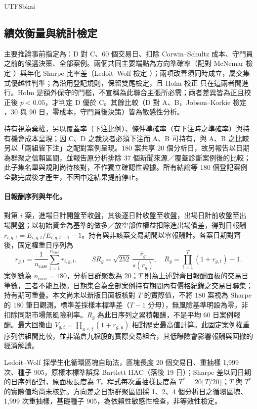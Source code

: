 \documentclass[12pt,a4paper]{article}
\newcommand{\grp}[1]{\textsf{#1}}
\begin{document}
\begin{CJK}{UTF8}{bkai}
\subsection{績效衡量與統計檢定}

主要推論事前指定為：\grp{D} 對 \grp{C}、60 個交易日、扣除 Corwin--Schultz 成本、守門員之前的候選決策、全部案例。兩個共同主要端點為方向準確率（配對 McNemar 檢定 \citep{mcnemar1947}）與年化 Sharpe 比率差（Ledoit--Wolf 檢定 \citep{ledoit2008sharpe}）；兩項改善須同時成立，屬交集式優越性判準；為沿用登記規則，保留雙尾檢定，且 Holm 校正 \citep{holm1979} 只在這兩者間進行。Holm 是額外保守的門檻，不宣稱為此聯合主張所必需；兩者差異皆為正且校正後 $p<0.05$，才判定 \grp{D} 優於 \grp{C}。其餘比較（\grp{D} 對 \grp{A}、\grp{B}，Jobson--Korkie 檢定 \citep{jobson1981sharpe}，30 與 90 日，零成本，守門員後決策）皆為敏感性分析。

持有視為棄權，另以覆蓋率（下注比例）、條件準確率（有下注時之準確率）與持有機會成本呈現；因 \grp{C}、\grp{D} 之裁決者必須下注而 \grp{A}、\grp{B} 可持有，與 \grp{A}、\grp{B} 之比較另以「兩組皆下注」之配對案例呈現。180 案共享 20 個分析日，故另報告以日期為群聚之信賴區間，並報告原分析排除 37 個新聞來源／覆蓋診斷案例後的比較；此子集名單與規則尚待核對，不作獨立確認性證據。所有結論等 180 個登記案例全數完成後才產生，不因中途結果提前停止。

\paragraph{日報酬序列與年化。} 對第 $i$ 案，進場日計開盤至收盤，其後逐日計收盤至收盤，出場日計前收盤至出場開盤；以初始資金為基準的做多／放空部位權益扣除進出場價差，得到日報酬 $r_{i,g,t}=E_{i,g,t}/E_{i,g,t-1}-1$。持有與非該案交易期間以零報酬計。各案日期對齊後，固定權重日序列為
\[
 r_{g,t}=\frac{1}{n_{\mathrm{case}}}\sum_{i=1}^{n_{\mathrm{case}}}r_{i,g,t},\qquad
 SR_g=\sqrt{252}\,\frac{\bar r_g}{s(r_g)},\quad
 R_g=\prod_{t=1}^{T}(1+r_{g,t})-1.
\]
案例數為 $n_{\mathrm{case}}=180$，分析日群聚數為 20；$T$ 則為上述對齊日報酬面板的交易日筆數，三者不能互換。日期集合為全部案例持有期間內有價格紀錄之交易日聯集；持有期可重疊。本文尚未以新版日面板核對 $T$ 的實際值，不將 180 案視為 Sharpe 的 180 筆日觀測。標準差採樣本標準差（$T-1$ 分母），無風險基準明設為零，非扣除同期市場無風險利率。$R_g$ 為此日序列之累積報酬，不是平均 60 日案例報酬。最大回撤由 $V_{g,t}=\prod_{u\leq t}(1+r_{g,u})$ 相對歷史最高值計算。此固定案例權重序列供組間比較，並非滿倉九檔股的實際交易組合，其低曝險會影響報酬與回撤的經濟解讀。

Ledoit--Wolf 採學生化循環區塊自助法，區塊長度 20 個交易日、重抽樣 1,999 次、種子 905，原樣本標準誤採 Bartlett HAC（落後 19 日）；Sharpe 差以同日期的日序列配對，原面板長度為 $T$，程式每次重抽樣長度為 $T^*=20\lfloor T/20\rfloor$；$T$ 與 $T^*$ 的實際值均尚未核對。方向差之日期群聚區間採 1、2、4 個分析日之循環區塊、1,999 次重抽樣，基礎種子 905，為依賴性敏感性檢查，非等效性檢定。


\end{CJK}
\end{document}
